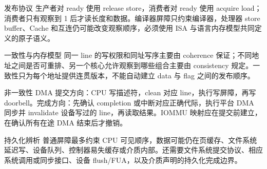 \begin{chapteranswer}{发布协议}
生产者对 ready 使用 release store，消费者对 ready 使用 acquire load；消费者只有观察到 1 后才读长度和数据。编译器屏障只约束编译器，处理器 store buffer、Cache 和互连仍可能改变观察顺序，必须使用 ISA 与语言内存模型共同定义的原子语义。
\end{chapteranswer}

\begin{chapteranswer}{一致性与内存模型}
同一 line 的写权限和同址写序主要由 coherence 保证；不同地址之间是否可重排、另一个核心允许观察到哪些组合主要由 consistency 规定。一致性只为每个地址提供连贯版本，不能自动建立 data 与 flag 之间的发布顺序。
\end{chapteranswer}

\begin{chapteranswer}{非一致性 DMA}
提交方向：CPU 写描述符，clean 对应 line，执行写屏障，再写 doorbell。完成方向：先确认 completion 或中断对应正确代际，执行平台 DMA 同步并 invalidate 设备写过的 line，再读取结果。IOMMU 映射应在提交前建立，在确认所有在途 DMA 结束后才撤销。
\end{chapteranswer}

\begin{chapteranswer}{持久化辨析}
普通屏障最多约束 CPU 可见顺序，数据可能仍在页缓存、文件系统延迟写、设备队列、控制器易失缓存或介质内部。还需要文件系统提交协议、相应系统调用或同步接口、设备 flush/FUA，以及介质声明的持久化完成边界。
\end{chapteranswer}
